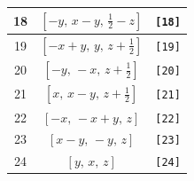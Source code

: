 \documentclass[fleqn,8pt]{jsarticle}
\begin{document}
\begin{longtable}{ccc}
18 & $\left[ - y,\, x - y,\, \frac{1}{2} - z \right]$ & {\tt [18]} \\ \hline
19 & $\left[ - x + y,\, y,\, z + \frac{1}{2} \right]$ & {\tt [19]} \\ \hline
20 & $\left[ - y,\, - x,\, z + \frac{1}{2} \right]$ & {\tt [20]} \\ \hline
21 & $\left[ x,\, x - y,\, z + \frac{1}{2} \right]$ & {\tt [21]} \\ \hline
22 & $\left[ - x,\, - x + y,\, z \right]$ & {\tt [22]} \\ \hline
23 & $\left[ x - y,\, - y,\, z \right]$ & {\tt [23]} \\ \hline
24 & $\left[ y,\, x,\, z \right]$ & {\tt [24]} \\
\end{longtable}
\end{document}
